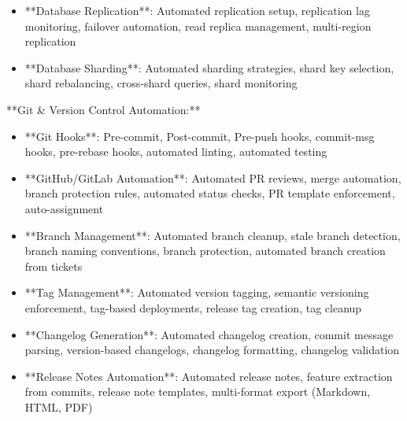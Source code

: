 \documentclass[11pt,a4paper]{article}
\begin{document}
\begin{itemize}
\item **Database Replication**: Automated replication setup, replication lag monitoring, failover automation, read replica management, multi-region replication
\end{itemize}

\begin{itemize}
\item **Database Sharding**: Automated sharding strategies, shard key selection, shard rebalancing, cross-shard queries, shard monitoring
\end{itemize}

**Git \& Version Control Automation:**

\begin{itemize}
\item **Git Hooks**: Pre-commit, Post-commit, Pre-push hooks, commit-msg hooks, pre-rebase hooks, automated linting, automated testing
\end{itemize}

\begin{itemize}
\item **GitHub/GitLab Automation**: Automated PR reviews, merge automation, branch protection rules, automated status checks, PR template enforcement, auto-assignment
\end{itemize}

\begin{itemize}
\item **Branch Management**: Automated branch cleanup, stale branch detection, branch naming conventions, branch protection, automated branch creation from tickets
\end{itemize}

\begin{itemize}
\item **Tag Management**: Automated version tagging, semantic versioning enforcement, tag-based deployments, release tag creation, tag cleanup
\end{itemize}

\begin{itemize}
\item **Changelog Generation**: Automated changelog creation, commit message parsing, version-based changelogs, changelog formatting, changelog validation
\end{itemize}

\begin{itemize}
\item **Release Notes Automation**: Automated release notes, feature extraction from commits, release note templates, multi-format export (Markdown, HTML, PDF)
\end{itemize}
\end{document}
